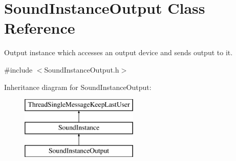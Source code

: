\hypertarget{class_sound_instance_output}{
\section{SoundInstanceOutput Class Reference}
\label{class_sound_instance_output}
}


Output instance which accesses an output device and sends output to it.  




{\ttfamily \#include $<$SoundInstanceOutput.h$>$}

Inheritance diagram for SoundInstanceOutput:\begin{figure}[H]
\begin{center}
\leavevmode
\includegraphics[height=3.000000cm]{class_sound_instance_output}
\end{center}
\end{figure}

